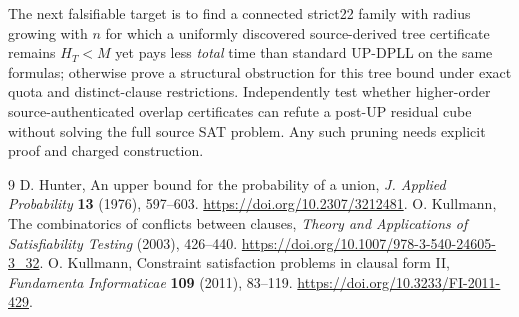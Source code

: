 \documentclass[11pt]{article}
\begin{document}
The next falsifiable target is to find a connected strict22 family with radius growing with $n$ for which a uniformly discovered source-derived tree certificate remains $H_T<M$ yet pays less \emph{total} time than standard UP-DPLL on the same formulas; otherwise prove a structural obstruction for this tree bound under exact quota and distinct-clause restrictions. Independently test whether higher-order source-authenticated overlap certificates can refute a post-UP residual cube without solving the full source SAT problem. Any such pruning needs explicit proof and charged construction.
\begin{thebibliography}{9}
 D. Hunter, An upper bound for the probability of a union, \emph{J. Applied Probability} \textbf{13} (1976), 597--603. \url{https://doi.org/10.2307/3212481}.
 O. Kullmann, The combinatorics of conflicts between clauses, \emph{Theory and Applications of Satisfiability Testing} (2003), 426--440. \url{https://doi.org/10.1007/978-3-540-24605-3_32}.
 O. Kullmann, Constraint satisfaction problems in clausal form II, \emph{Fundamenta Informaticae} \textbf{109} (2011), 83--119. \url{https://doi.org/10.3233/FI-2011-429}.
\end{thebibliography}
\end{document}

